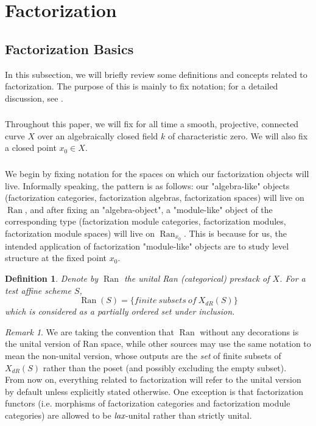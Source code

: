 \documentclass[10pt]{amsart}
\newtheorem{defn}[subsubsection]{Definition}
\theoremstyle{remark}
\newtheorem{rem}[subsubsection]{Remark}
\newcommand{\on}[1]{\operatorname{#1}}
\newcommand{\Ran}{\on{Ran}}
\newcommand{\sssec}[1]{\subsubsection{}}
\begin{document}
\section{Factorization} \label{Factorization}
\subsection{Factorization Basics} \label{Factorization Basics}
In this subsection, we will briefly review some definitions and concepts related to factorization. The purpose of this is mainly to fix notation; for a detailed discussion, see \cite{factorization}.

\sssec{}
Throughout this paper, we will fix for all time a smooth, projective, connected curve $X$ over an algebraically closed field $k$ of characteristic zero. We will also fix a closed point $x_0 \in X$.

\sssec{}
We begin by fixing notation for the spaces on which our factorization objects will live. Informally speaking, the pattern is as follows: our "algebra-like" objects (factorization categories, factorization algebras, factorization spaces) will live on $\Ran$, and after fixing an "algebra-object", a "module-like" object of the corresponding type (factorization module categories, factorization modules, factorization module spaces) will live on $\Ran_{x_0}$. This is because for us, the intended application of factorization "module-like" objects are to study level structure at the fixed point $x_0$.

\begin{defn}
    Denote by $\Ran$ the unital Ran (categorical) prestack of $X$. For a test affine scheme $S$,
    $$
    \Ran(S) = \{finite \ subsets \ of \ X_{dR}(S)\}
    $$
    which is considered as a partially ordered set under inclusion.
\end{defn}

\begin{rem}
    We are taking the convention that $\Ran$ without any decorations is the unital version of Ran space, while other sources may use the same notation to mean the non-unital version, whose outputs are the \emph{set} of finite subsets of $X_{dR}(S)$ rather than the poset (and possibly excluding the empty subset).
    \\
    From now on, everything related to factorization will refer to the unital version by default unless explicitly stated otherwise. One exception is that factorization functors (i.e. morphisms of factorization categories and factorization module categories) are allowed to be $\emph{lax}$-unital rather than strictly unital.
\end{rem}
\end{document}
